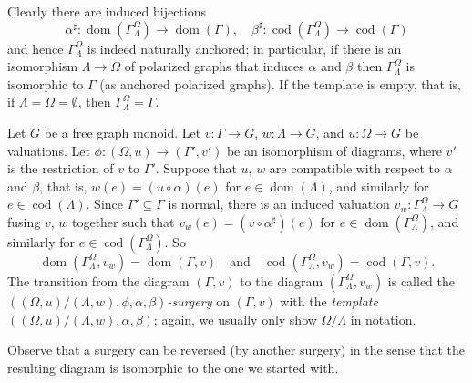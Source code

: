 \documentclass[12pt]{amsart}
\theoremstyle{plain}
\theoremstyle{definition}
\theoremstyle{remark}
\numberwithin{equation}{section}
\theoremstyle{plain}
\DeclareMathOperator{\dom}{dom}
\DeclareMathOperator{\cod}{cod}
\newcommand{\0}{\emptyset}
\newcommand{\fun}{\longrightarrow}
\newcommand{\sub}{\subseteq}
\newcommand{\dand}{\quad \text{and} \quad}
\newcommand{\memph}[1]{{\color{magenta}\emph{#1}}}
\begin{document}
Clearly there are induced bijections
\[
\alpha^\sharp : \dom(\Gamma^\Omega_\Lambda) \fun \dom(\Gamma), \quad \beta^\sharp:  \cod(\Gamma^\Omega_\Lambda) \fun \cod(\Gamma)
\]
and hence $\Gamma^\Omega_\Lambda$ is indeed naturally anchored; in particular, if there is an isomorphism $\Lambda \fun \Omega$ of polarized graphs that induces $\alpha$ and $\beta$ then $\Gamma^\Omega_\Lambda$ is isomorphic to $\Gamma$ (as anchored polarized graphs). If the template is empty, that is, if $\Lambda = \Omega = \0$, then $\Gamma^\Omega_\Lambda = \Gamma$.


Let $G$ be a free graph monoid. Let $v : \Gamma \fun G$, $w : \Lambda \fun G$,  and $u : \Omega \fun G$ be valuations. Let $\phi : (\Omega, u) \fun (\Gamma', v')$ be an isomorphism of  diagrams, where  $v'$ is the restriction of $v$ to $\Gamma'$. Suppose that $u$, $w$ are compatible with respect to $\alpha$ and $\beta$, that is, $w(e) = (u \circ \alpha)(e)$ for $e \in \dom(\Lambda)$,  and similarly for $e \in \cod(\Lambda)$. Since $\Gamma' \sub \Gamma$ is normal, there is an induced valuation $v_w : \Gamma^\Omega_\Lambda \fun G$ fusing $v$, $w$ together such that $v_w(e) = (v \circ \alpha^\sharp)( e)$ for $e \in \dom(\Gamma^\Omega_\Lambda)$, and similarly for  $e \in \cod(\Gamma^\Omega_\Lambda)$. So \[
\dom(\Gamma^\Omega_\Lambda, v_w) = \dom(\Gamma, v) \dand \cod(\Gamma^\Omega_\Lambda, v_w) = \cod(\Gamma, v).
\]
The transition from the diagram $(\Gamma, v)$ to the diagram $(\Gamma^\Omega_\Lambda, v_w)$ is called the \memph{$((\Omega, u) / (\Lambda, w), \phi, \alpha, \beta)$-surgery} on $(\Gamma, v)$ with the \memph{template} $((\Omega, u) / (\Lambda, w), \alpha, \beta)$; again,  we usually only show $\Omega / \Lambda$ in notation.

Observe that a surgery can be reversed (by another surgery) in the sense that the resulting diagram is isomorphic to the one we started with.
\end{document}

